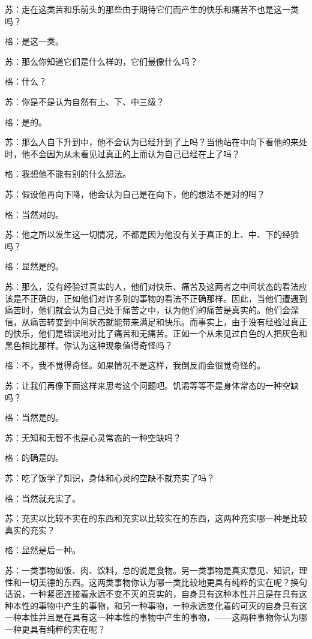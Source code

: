 \documentclass[12pt,oneside]{book}
\begin{document}
苏：走在这类苦和乐前头的那些由于期待它们而产生的快乐和痛苦不也是这一类吗？

格：是这一类。

苏：那么你知道它们是什么样的，它们最像什么吗？

格：什么？

苏：你是不是认为自然有上、下、中三级？

格：是的。

苏：那么人自下升到中，他不会认为已经升到了上吗？当他站在中向下看他的来处时，他不会因为从未看见过真正的上而认为自己已经在上了吗？

格：我想他不能有别的什么想法。

苏：假设他再向下降，他会认为自己是在向下，他的想法不是对的吗？

格：当然对的。

苏：他之所以发生这一切情况，不都是因为他没有关于真正的上、中、下的经验吗？

格：显然是的。

苏：那么，没有经验过真实的人，他们对快乐、痛苦及这两者之中间状态的看法应该是不正确的，正如他们对许多别的事物的看法不正确那样。因此，当他们遭遇到痛苦时，他们就会认为自己处于痛苦之中，认为他们的痛苦是真实的。他们会深信，从痛苦转变到中间状态就能带来满足和快乐。而事实上，由于没有经验过真正的快乐，他们是错误地对比了痛苦和无痛苦。正如一个从未见过白色的人把灰色和黑色相比那样。你认为这种现象值得奇怪吗？

格：不，我不觉得奇怪。如果情况不是这样，我倒反而会很觉奇怪的。

苏：让我们再像下面这样来思考这个问题吧。饥渴等等不是身体常态的一种空缺吗？

格：当然是的。

苏：无知和无智不也是心灵常态的一种空缺吗？

格：的确是的。

苏：吃了饭学了知识，身体和心灵的空缺不就充实了吗？

格：当然就充实了。

苏：充实以比较不实在的东西和充实以比较实在的东西，这两种充实哪一种是比较真实的充实？

格：显然是后一种。

苏：一类事物如饭、肉、饮料，总的说是食物。另一类事物是真实意见、知识，理性和一切美德的东西。这两类事物你认为哪一类比较地更具有纯粹的实在呢？换句话说，一种紧密连接着永远不变不灭的真实的，自身具有这种本性并且是在具有这种本性的事物中产生的事物，和另一种事物，一种永远变化着的可灭的自身具有这一种本性并且是在具有这一种本性的事物中产生的事物，——这两种事物你认为哪一种更具有纯粹的实在呢？
\end{document}
